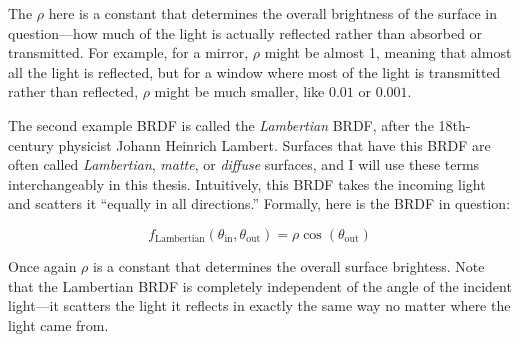 The $\rho$ here is a constant that determines the overall brightness of the surface in question---how much of the light is actually reflected rather than absorbed or transmitted. For example, for a mirror, $\rho$ might be almost 1, meaning that almost all the light is reflected, but for a window where most of the light is transmitted rather than reflected, $\rho$ might be much smaller, like $0.01$ or $0.001$.


The second example BRDF is called the \emph{Lambertian} BRDF, after the 18th-century physicist Johann Heinrich Lambert. Surfaces that have this BRDF are often called \emph{Lambertian}, \emph{matte}, or \emph{diffuse} surfaces, and I will use these terms interchangeably in this thesis. Intuitively, this BRDF takes the incoming light and scatters it ``equally in all directions.'' Formally, here is the BRDF in question:

\[    
    f_{\textrm{Lambertian}}(\theta_{\textrm{in}}, \theta_{\textrm{out}}) = \rho \cos(\theta_{\textrm{out}})
\]    

Once again $\rho$ is a constant that determines the overall surface brightess. Note that the Lambertian BRDF is completely independent of the angle of the incident light---it scatters the light it reflects in exactly the same way no matter where the light came from.\footnotemark 


